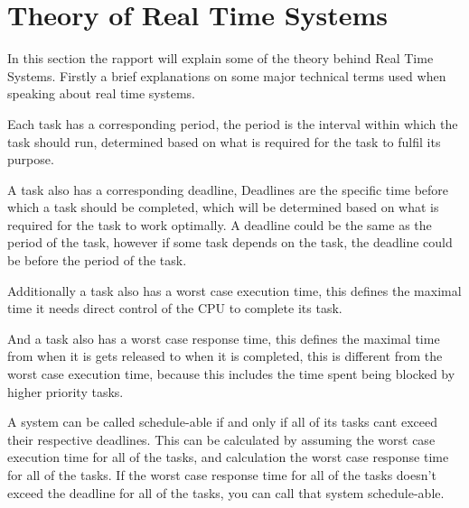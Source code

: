 \section{Theory of Real Time Systems}
In this section the rapport will explain some of the theory behind Real Time Systems. Firstly a brief explanations on some major technical terms used when speaking about real time systems. 

Each task has a corresponding period, the period is the interval within which the task should run, determined based on what is required for the task to fulfil its purpose.

A task also has a corresponding deadline, Deadlines are the specific time before which a task should be completed, which will be determined based on what is required for the task to work optimally. A deadline could be the same as the period of the task, however if some task depends on the task, the deadline could be before the period of the task. 

Additionally a task also has a worst case execution time, this defines the maximal time it needs direct control of the CPU to complete its task.

And a task also has a worst case response time, this defines the maximal time from when it is gets released to when it is completed, this is different from the worst case execution time, because this includes the time spent being blocked by higher priority tasks.

A system can be called schedule-able if and only if all of its tasks cant exceed their respective deadlines. This can be calculated by assuming the worst case execution time for all of the tasks, and calculation the worst case response time for all of the tasks. If the worst case response time for all of the tasks doesn't exceed the deadline for all of the tasks, you can call that system schedule-able. 


